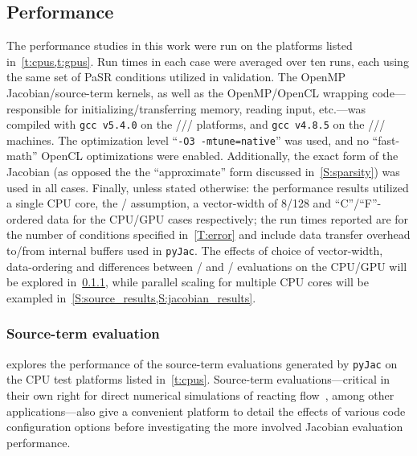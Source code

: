 \documentclass[12pt,number,sort&compress,preprint]{elsarticle}
\begin{document}
\subsection{Performance}
\label{S:results}
The performance studies in this work were run on the platforms listed in~\cref{t:cpus,t:gpus}.
Run times in each case were averaged over ten runs, each using the same set of PaSR conditions utilized in validation.
The OpenMP Jacobian\slash source-term kernels, as well as the OpenMP\slash OpenCL wrapping code---responsible for initializing\slash transferring memory, reading input, etc.---was compiled with \texttt{gcc v5.4.0} on the \avx/\slash\gpunew/ platforms, and \texttt{gcc v4.8.5} on the \sse/\slash\gpuold/ machines.
The optimization level ``\texttt{-O3 -mtune=native}'' was used, and no ``fast-math'' OpenCL optimizations were enabled.
Additionally, the exact form of the Jacobian (as opposed the the ``approximate'' form discussed in~\cref{S:sparsity}) was used in all cases.
Finally, unless stated otherwise: the performance results utilized a single CPU core, the \conp/ assumption, a vector-width of \num{8}\slash\num{128} and ``C''\slash ``F''-ordered data for the CPU\slash GPU cases respectively; the run times reported are for the number of conditions specified in~\cref{T:error} and include data transfer overhead to\slash from internal buffers used in \texttt{pyJac}.
The effects of choice of vector-width, data-ordering and differences between \conp/ and \conv/ evaluations on the CPU\slash GPU will be explored in~\cref{S:source_results}, while parallel scaling for multiple CPU cores will be exampled in~\cref{S:source_results,S:jacobian_results}.

\subsubsection{Source-term evaluation}
\label{S:source_results}

 explores the performance of the source-term evaluations generated by \texttt{pyJac} on the CPU test platforms listed in~\cref{t:cpus}.
Source-term evaluations---critical in their own right for direct numerical simulations of reacting flow~\cite{Spafford:2010aa}, among other applications---also give a convenient platform to detail the effects of various code configuration options before investigating the more involved Jacobian evaluation performance.
\end{document}
